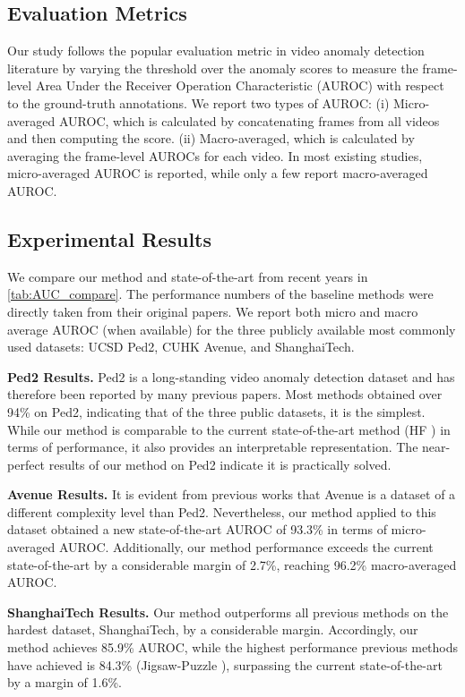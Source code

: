 \documentclass[10pt,twocolumn,letterpaper]{article}
\begin{document}
\subsection{Evaluation Metrics}
Our study follows the popular evaluation metric in video anomaly detection literature by varying the threshold over the anomaly scores to measure the frame-level Area Under the Receiver Operation Characteristic (AUROC) with respect to the ground-truth annotations. We report two types of AUROC: (i) Micro-averaged AUROC, which is calculated by concatenating frames from all videos and then computing the score. (ii) Macro-averaged, which is calculated by averaging the frame-level AUROCs for each video. In most existing studies, micro-averaged AUROC is reported, while only a few report macro-averaged AUROC.

\subsection{Experimental Results}
\label{experiments}
We compare our method and state-of-the-art from recent years in \cref{tab:AUC_compare}. The performance numbers of the baseline methods were directly taken from their original papers. We report both micro and macro average AUROC (when available) for the three publicly available most commonly used datasets: UCSD Ped2, CUHK Avenue, and ShanghaiTech.

\textbf{Ped2 Results.} Ped2 is a long-standing video anomaly detection dataset and has therefore been reported by many previous papers. Most methods obtained over 94\% on Ped2, indicating that of the three public datasets, it is the simplest. While our method is comparable to the current state-of-the-art method (HF \cite{vad_iccv_2021}) in terms of performance, it also provides an interpretable representation. The near-perfect results of our method on Ped2 indicate it is practically solved. 

\textbf{Avenue Results.} It is evident from previous works that Avenue is a dataset of a different complexity level than Ped2. Nevertheless, our method applied to this dataset obtained a new state-of-the-art AUROC of 93.3\% in terms of micro-averaged AUROC. Additionally, our method performance exceeds the current state-of-the-art by a considerable margin of 2.7\%, reaching 96.2\% macro-averaged AUROC.

\textbf{ShanghaiTech Results.} Our method outperforms all previous methods on the hardest dataset, ShanghaiTech, by a considerable margin. Accordingly, our method achieves 85.9\% AUROC, while the highest performance previous methods have achieved is 84.3\% (Jigsaw-Puzzle \cite{jigsaw_puzzles_eccv2022}), surpassing the current state-of-the-art by a margin of 1.6\%.   
\end{document}
